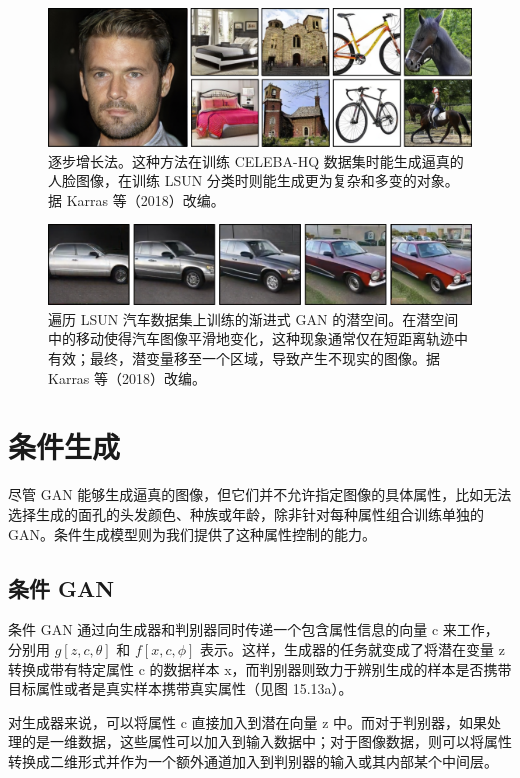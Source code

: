 \begin{figure}[ht!]
\centering
\includegraphics[width=0.7\linewidth]{png/chapter15/GANProgressiveResults.png}
\caption{逐步增长法。这种方法在训练 CELEBA-HQ 数据集时能生成逼真的人脸图像，在训练 LSUN 分类时则能生成更为复杂和多变的对象。据 Karras 等（2018）改编。}
\end{figure}


\begin{figure}[ht!]
\centering
\includegraphics[width=0.7\linewidth]{png/chapter15/GANProgressiveInterp.png}
\caption{遍历 LSUN 汽车数据集上训练的渐进式 GAN 的潜空间。在潜空间中的移动使得汽车图像平滑地变化，这种现象通常仅在短距离轨迹中有效；最终，潜变量移至一个区域，导致产生不现实的图像。据 Karras 等（2018）改编。}
\end{figure}

\section{条件生成}
尽管 GAN 能够生成逼真的图像，但它们并不允许指定图像的具体属性，比如无法选择生成的面孔的头发颜色、种族或年龄，除非针对每种属性组合训练单独的 GAN。条件生成模型则为我们提供了这种属性控制的能力。
\subsection{条件 GAN}
条件 GAN 通过向生成器和判别器同时传递一个包含属性信息的向量 c 来工作，分别用 \(g[z, c, \theta]\) 和 \(f[x, c, \phi]\) 表示。这样，生成器的任务就变成了将潜在变量 z 转换成带有特定属性 c 的数据样本 x，而判别器则致力于辨别生成的样本是否携带目标属性或者是真实样本携带真实属性（见图 15.13a）。

对生成器来说，可以将属性 c 直接加入到潜在向量 z 中。而对于判别器，如果处理的是一维数据，这些属性可以加入到输入数据中；对于图像数据，则可以将属性转换成二维形式并作为一个额外通道加入到判别器的输入或其内部某个中间层。

